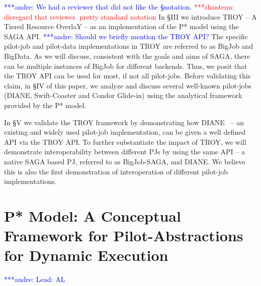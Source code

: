 \documentclass[conference,final]{IEEEtran}
\newcommand{\jhanote}[1]{ {\textcolor{red} { ***shantenu: #1 }}}
\newcommand{\alnote}[1]{ {\textcolor{blue} { ***andre: #1 }}}
\newcommand{\alnote}[1]{}
\newcommand{\jhanote}[1]{}
\newcommand{\upp}{\vspace*{-0.5em}}
\begin{document}
\alnote{We had a reviewer that did not like the \S notation.}
\jhanote{disregard that reviewer. pretty standard notation} In \S{III}
we introduce TROY -- A Tiered Resource OverlaY -- as an implementation
of the P* model using the SAGA API. \alnote{Should we briefly mention
  the TROY API?} The specific pilot-job and pilot-data implementations
in TROY are referred to as BigJob and BigData. As we will discuss,
consistent with the goals and aims of SAGA, there can be
multiple %
instances of BigJob for different backends.  Thus, we posit that the
TROY API %
can be used for most, if not all pilot-jobs. Before validating this
claim, in \S{IV} of this paper, we analyze and discuss several
well-known pilot-jobs (DIANE, Swift-Coaster and Condor Glide-in) using
the analytical framework provided by the P* model.


In \S{V} we validate the TROY framework by demonstrating how
DIANE~\cite{Moscicki:908910} -- an existing and widely used pilot-job
implementation, can be given a well defined API via the TROY API. To
further substantiate the impact of TROY, we will demonstrate
interoperability between different PJs by using the same API -- a
native SAGA based PJ, referred to as BigJob-SAGA, and DIANE. We
believe this is also the first demonstration of interoperation of
different pilot-job implementations.





\section{P* Model: A Conceptual Framework for Pilot-Abstractions for
  Dynamic Execution \upp\upp}
\alnote{Lead: AL}
\label{sec:pilot-model}
\end{document}
